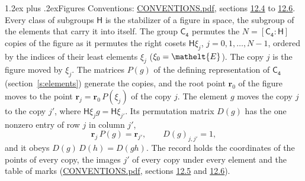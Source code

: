 \documentclass[10pt,a4paper]{article}
\makeatletter
\renewcommand\section{\@startsection{section}{1}{\z@}{-3ex plus -1ex minus -.2ex}%
  {1.2ex plus .2ex}{\normalfont\large\sffamily\bfseries\color{parttitle}}}
\numberwithin{equation}{section}
\newcommand{\eltfont}[1]{{\let\sigma\eltsigma\mathelt{#1}}}
\newcommand{\grp}[1]{\mathsf{#1}}
\newcommand{\cls}[1]{\eltfont{#1}}
\newcommand{\pointr}{\mathbf{r}}
\makeatother
\begin{document}
\section{Figures}\label{s:permutation}
Conventions: \href{../../CONVENTIONS.pdf}{CONVENTIONS.pdf}, sections \href{../../CONVENTIONS.pdf\#conv.12.4}{12.4} to \href{../../CONVENTIONS.pdf\#conv.12.6}{12.6}.
Every class of subgroups $\grp{H}$ is the stabilizer of a figure in space, the subgroup of the elements that carry it into itself. \label{n:local.orbit.size}\label{n:element.coset.least}\label{n:index.coset}The group $\grp{C_{4}}$ permutes the $N = [\grp{C_{4}} : \grp{H}]$ copies of the figure as it permutes the right cosets $\grp{H}\xi_j$, $j = 0, 1, \dots, N - 1$, ordered by the indices of their least elements $\xi_j$ ($\xi_0 = \cls{E}$). The copy $j$ is the figure moved by $\xi_j$. The matrices $P(g)$ of the defining representation of $\grp{C_{4}}$ (section~\ref{s:elements}) generate the copies, and the root point $\pointr_0$ of the figure moves to the point $\pointr_j = \pointr_0\, P(\xi_j)$ of the copy $j$. \label{n:local.coset.image}The element $g$ moves the copy $j$ to the copy $j'$, where $\grp{H}\xi_j g = \grp{H}\xi_{j'}$. \label{n:local.matrix.permutation}Its permutation matrix $D(g)$ has the one nonzero entry of row $j$ in column $j'$,
\begin{equation}\label{e:perm.matrix}\pointr_j\, P(g) = \pointr_{j'}, \qquad D(g)_{j,j'} = 1,\end{equation}
and it obeys $D(g)\, D(h) = D(gh)$. The record holds the coordinates of the points of every copy, the images $j'$ of every copy under every element and the table of marks (\href{../../CONVENTIONS.pdf}{CONVENTIONS.pdf}, sections \href{../../CONVENTIONS.pdf\#conv.12.5}{12.5} and \href{../../CONVENTIONS.pdf\#conv.12.6}{12.6}).
\end{document}
